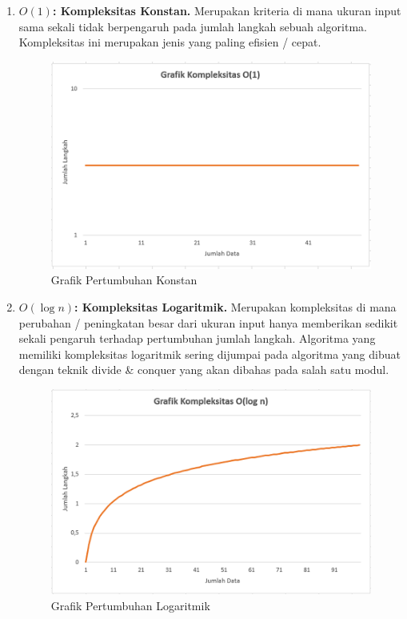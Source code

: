 \begin{enumerate}
    \item \textbf{$O (1)$: Kompleksitas Konstan.} Merupakan kriteria di mana ukuran input sama sekali tidak berpengaruh pada jumlah langkah sebuah algoritma. Kompleksitas ini merupakan jenis yang paling efisien / cepat.
        
    \begin{figure}
        \centering
        \includegraphics[width=\textwidth]{fig/ConstantGrowth}
        \caption{Grafik Pertumbuhan Konstan}
    \end{figure}

    \FloatBarrier

    \item \textbf{$O (\log n)$: Kompleksitas Logaritmik.} Merupakan kompleksitas di mana perubahan / peningkatan besar dari ukuran input hanya memberikan sedikit sekali pengaruh terhadap pertumbuhan jumlah langkah. Algoritma yang memiliki kompleksitas logaritmik sering dijumpai pada algoritma yang dibuat dengan teknik divide \& conquer yang akan dibahas pada salah satu modul.

    \begin{figure}
        \centering
        \includegraphics[width=\textwidth]{fig/LogarithmicGrowth}
        \caption{Grafik Pertumbuhan Logaritmik}
    \end{figure}


\end{enumerate}
